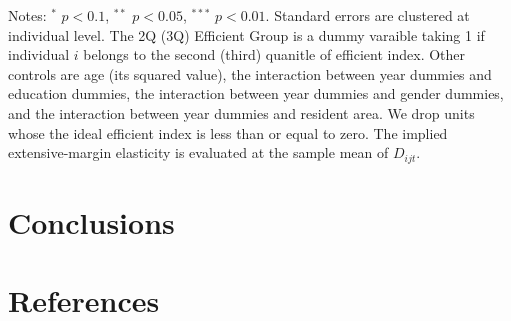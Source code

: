 \documentclass[ review  , 3p ]{elsarticle}
\begin{document}
\begin{table}
\begin{threeparttable}
  \begin{tablenotes}
  \item Notes: $^{*}$ $p < 0.1$, $^{**}$ $p < 0.05$, $^{***}$ $p < 0.01$. Standard errors are clustered at individual level. The 2Q (3Q) Efficient Group is a dummy varaible taking 1 if individual $i$ belongs to the second (third) quanitle of efficient index. Other controls are age (its squared value), the interaction between year dummies and education dummies, the interaction between year dummies and gender dummies, and the interaction between year dummies and resident area. We drop units whose the ideal efficient index is less than or equal to zero. The implied extensive-margin elasticity is evaluated at the sample mean of $D_{ijt}$.
  \end{tablenotes}
  \end{threeparttable}
  \end{table}

  \hypertarget{conclusions}{%
  \section{Conclusions}\label{conclusions}}

  \clearpage

  \hypertarget{references}{%
  \section*{References}\label{references}}
\end{document}
